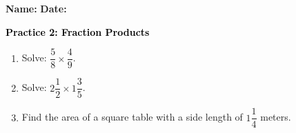 \documentclass[12pt, letterpaper, fleqn]{article}
\begin{document}
\textbf{Name:} \underline{\hspace{5cm}}
\hfill
\textbf{Date:} \underline{\hspace{3cm}}\\

\begin{tcolorbox}[colback=customteal!20]
    \large\textcolor{black}{\textbf{Practice 2: Fraction Products}}
\end{tcolorbox}
\begin{enumerate}[itemsep=3.5cm, leftmargin=0.6cm]
\item Solve: $\dfrac{5}{8} \times \dfrac{4}{9}$.
\vspace{3.5cm}
\item Solve: $2\dfrac{1}{2} \times 1\dfrac{3}{5}$.
\vspace{3.5cm}
\item Find the area of a square table with a side length of $1\dfrac{1}{4}$ meters.
\end{enumerate}
\end{document}

